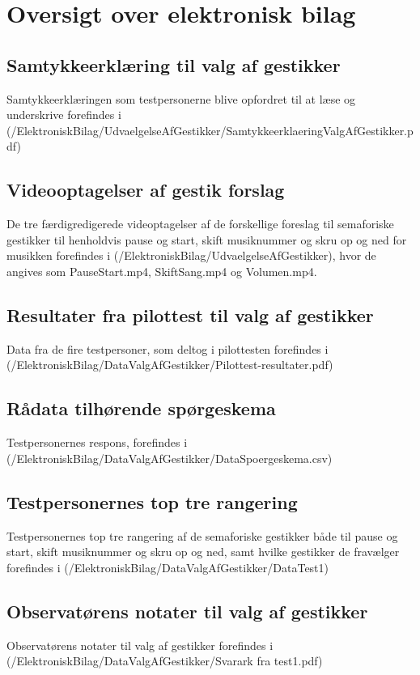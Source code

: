 \chapter{Oversigt over elektronisk bilag}
\label{app:OversigtOverElektroniskBilag}
%
%
\section{Samtykkeerklæring til valg af gestikker}
\label{app:SamtykkeerklaeringValgAfGestikker}
%
Samtykkeerklæringen som testpersonerne blive opfordret til at læse og underskrive forefindes i (/ElektroniskBilag/UdvaelgelseAfGestikker/SamtykkeerklaeringValgAfGestikker.pdf)
%
\section{Videooptagelser af gestik forslag}
\label{app:VideooptagelseGestikForslag}
%
De tre færdigredigerede videoptagelser af de forskellige foreslag til semaforiske gestikker til henholdvis pause og start, skift musiknummer og skru op og ned for musikken forefindes i (/ElektroniskBilag/UdvaelgelseAfGestikker), hvor de angives som PauseStart.mp4, SkiftSang.mp4 og Volumen.mp4.
%
\section{Resultater fra pilottest til valg af gestikker}
\label{app:ResultaterPilottestValgAfGestikker}
%
Data fra de fire testpersoner, som deltog i pilottesten forefindes i \\
(/ElektroniskBilag/DataValgAfGestikker/Pilottest-resultater.pdf)
%
\section{Rådata tilhørende spørgeskema}
\label{app:RaaDataSpoergeskema}
%
Testpersonernes respons, forefindes i (/ElektroniskBilag/DataValgAfGestikker/DataSpoergeskema.csv)
%
\section{Testpersonernes top tre rangering}
\label{app:TestpersonernesTopTre}
%
Testpersonernes top tre rangering af de semaforiske gestikker både til pause og start, skift musiknummer og skru op og ned, samt hvilke gestikker de fravælger forefindes i (/ElektroniskBilag/DataValgAfGestikker/DataTest1)
%
\section{Observatørens notater til valg af gestikker}
\label{app:NoterValgAfGestikker}
%
Observatørens notater til valg af gestikker forefindes i (/ElektroniskBilag/DataValgAfGestikker/Svarark fra test1.pdf)
%
